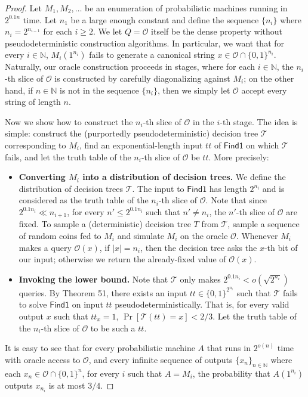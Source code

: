 \documentclass[10pt,a4paper]{article}
\begin{document}
\begin{proof}
Let $M_1,M_2,\ldots$ be an enumeration of probabilistic machines running in $2^{0.1n}$ time. Let $n_1$ be a large enough constant and define the sequence $\{n_i\}$ where $n_i=2^{n_{i-1}}$ for each $i\geq2$. We let $Q=\mathcal O$ itself be the dense property without pseudodeterministic construction algorithms. In particular, we want that for every $i\in\mathbb N$, $M_i(1^{n_i})$ fails to generate a canonical string $x\in\mathcal O\cap\{0,1\}^{n_i}$. Naturally, our oracle construction proceeds in stages, where for each $i\in\mathbb N$, the $n_i$-th slice of $\mathcal O$ is constructed by carefully diagonalizing against $M_i$; on the other hand, if $n\in\mathbb N$ is not in the sequence $\{n_i\}$, then we simply let $\mathcal O$ accept every string of length $n$.

Now we show how to construct the $n_i$-th slice of $\mathcal O$ in the $i$-th stage. The idea is simple: construct the (purportedly pseudodeterministic) decision tree $\mathcal T$ corresponding to $M_i$, find an exponential-length input $tt$ of $\mathsf{Find1}$ on which $\mathcal T$ fails, and let the truth table of the $n_i$-th slice of $\mathcal O$ be $tt$. More precisely:
\begin{itemize}
\item \textbf{Converting $M_i$ into a distribution of decision trees.} We define the distribution of decision trees $\mathcal T$. The input to $\mathsf{Find1}$ has length $2^{n_i}$ and is considered as the truth table of the $n_i$-th slice of $\mathcal O$. Note that since $2^{0.1n_i}\ll n_{i+1}$, for every $n'\leq2^{0.1n_i}$ such that $n'\neq n_i$, the $n'$-th slice of $\mathcal O$ are fixed. To sample a (deterministic) decision tree $T$ from $\mathcal T$, sample a sequence of random coins fed to $M_i$ and simulate $M_i$ on the oracle $\mathcal O$. Whenever $M_i$ makes a query $\mathcal O(x)$, if $|x|=n_i$, then the decision tree asks the $x$-th bit of our input; otherwise we return the already-fixed value of $\mathcal O(x)$.
\item \textbf{Invoking the lower bound.} Note that $\mathcal T$ only makes $2^{0.1n_i}<o(\sqrt{2^{n_i}})$ queries. By Theorem 51, there exists an input $tt\in\{0,1\}^{2^{n_i}}$ such that $\mathcal T$ fails to solve $\mathsf{Find1}$ on input $tt$ pseudodeterministically. That is, for every valid output $x$ such that $tt_x=1$, $\Pr[\mathcal T(tt)=x]<2/3$. Let the truth table of the $n_i$-th slice of $\mathcal O$ to be such a $tt$.
\end{itemize}
It is easy to see that for every probabilistic machine $A$ that runs in $2^{o(n)}$ time with oracle access to $\mathcal O$, and every infinite sequence of outputs $\{x_n\}_{n\in\mathbb N}$ where each $x_n\in\mathcal O\cap\{0,1\}^n$, for every $i$ such that $A=M_i$, the probability that $A(1^{n_i})$ outputs $x_{n_i}$ is at most $3/4$.


\end{proof}
\end{document}
